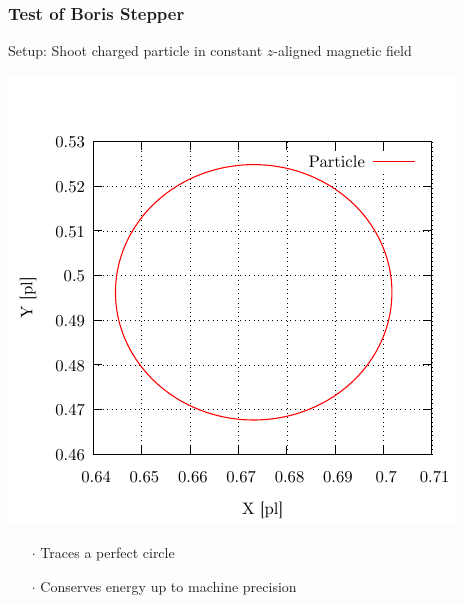 \documentclass[5pt]{beamer}
\begin{document}
\begin{frame}
  \frametitle{Test of Boris Stepper}
  Setup: Shoot charged particle in constant $z$-aligned magnetic field\\
  \begin{minipage}{0.45\textwidth}
    \centering
  \includegraphics[width=\columnwidth]{trajectory_constant.pdf}
  \end{minipage}
  \hfill
  \begin{minipage}{0.45\textwidth}
  
  \begin{itemize}
    \item[$\cdot$] Traces a perfect circle
    \item[$\cdot$] Conserves energy up to machine precision
  \end{itemize}
\end{minipage}
\end{frame}
\end{document}
